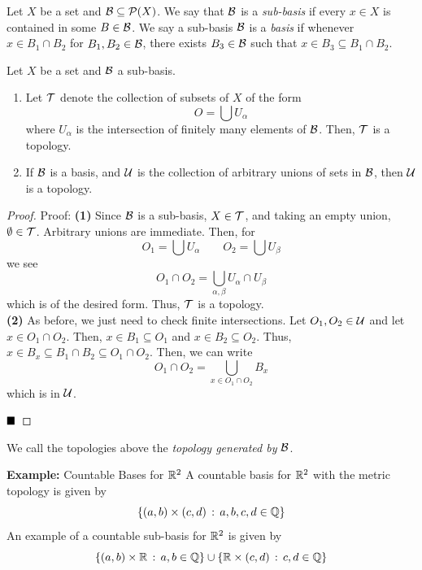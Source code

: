 \begin{definition}
    Let $X$ be a set and $\cal{B} \subseteq \P(X)$. We say that $\cal{B}$ is a \emph{sub-basis} if every $x \in X$ is contained in some $B \in \cal{B}$. We say a sub-basis $\cal{B}$ is a \emph{basis} if whenever $x \in B_1 \cap B_2$ for $B_1, B_2 \in \cal{B}$, there exists $B_3 \in \cal{B}$ such that $x \in B_3 \subseteq B_1 \cap B_2$.
\end{definition}

\begin{lemma}
    Let $X$ be a set and $\cal{B}$ a sub-basis.
    \begin{enumerate}
        \item Let $\cal{T}$ denote the collection of subsets of $X$ of the form
        \[ O = \bigcup U_{\alpha} \]
        where $U_{\alpha}$ is the intersection of finitely many elements of $\cal{B}$. Then, $\cal{T}$ is a topology.
        \item If $\cal{B}$ is a basis, and $\cal{U}$ is the collection of arbitrary unions of sets in $\cal{B}$, then $\cal{U}$ is a topology.
    \end{enumerate}
\end{lemma}
\begin{proof}{Proof:}
    \textbf{(1)} Since $\cal{B}$ is a sub-basis, $X \in \cal{T}$, and taking an empty union, $\emptyset \in \cal{T}$. Arbitrary unions are immediate. Then, for
    \[ O_1 = \bigcup U_{\alpha} \qquad O_2 = \bigcup U_{\beta} \]
    we see
    \[ O_1 \cap O_2 = \bigcup_{\alpha, \beta} U_{\alpha} \cap U_{\beta} \]
    which is of the desired form. Thus, $\cal{T}$ is a topology.\\

    \textbf{(2)} As before, we just need to check finite intersections. Let $O_1, O_2 \in \cal{U}$ and let $x \in O_1 \cap O_2$. Then, $x \in B_1 \subseteq O_1$ and $x \in B_2 \subseteq O_2$. Thus, $x \in B_x \subseteq B_1 \cap B_2 \subseteq O_1 \cap O_2$. Then, we can write
    \[ O_1 \cap O_2 = \bigcup_{x \in O_1 \cap O_2} B_x \]
    which is in $\cal{U}$.

    $\qed$
\end{proof}

We call the topologies above the \emph{topology generated by $\cal{B}$}.

\begin{example}{\textbf{Example:} Countable Bases for $\R^2$}
    A countable basis for $\R^2$ with the metric topology is given by
    \[ \{(a, b) \times (c, d) \col a, b, c, d \in \Q\} \]
    An example of a countable sub-basis for $\R^2$ is given by
    \[ \{(a, b) \times \R \col a, b \in \Q\} \cup \{\R \times (c, d) \col c, d \in \Q\} \]
\end{example}

